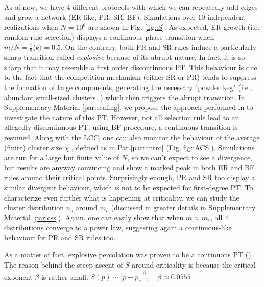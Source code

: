 As of now, we have 4 different protocols with which we can repeatedly add edges and grow a network (ER-like, PR, SR, BF). Simulations over $10$ independent realizations when $N = 10^6$ are shown in Fig. \ref{fig::S}. As expected, ER growth (i.e. random rule selection) displays a continuous phase transition when $m/N = \frac{1}{2}\langle k \rangle = 0.5$. On the contrary, both PR and SR rules induce a particularly sharp transition called \textit{explosive} because of its abrupt nature. In fact, it is so sharp that it may resemble a first order discontinuous PT. This behaviour is due to the fact that the competition mechanism (either SR or PR) tends to suppress the formation of large components, generating the necessary "powder keg" (i.e., abundant small-sized clusters, \cite{BOCCALETTI20161}) which then triggers the abrupt transition. In Supplementary Material \ref{par:scaling}, we propose the approach performed in \cite{Achlioptas} to investigate the nature of this PT. However, not all selection rule lead to an allegedly discontinuous PT: using BF procedure, a continuous transition is resumed. Along with the LCC, one can also monitor the behaviour of the average (finite) cluster size $\chi$ , defined as in Par.\ref{par::intro} (Fig.\ref{fig::ACS}). Simulations are run for a large but finite value of $N$, so we can't expect to see a divergence, but results are anyway convincing and show a marked peak in both ER and BF rules around their critical points. Surprisingly enough, PR and SR too display a similar divergent behaviour, which is not to be expected for first-degree PT. To characterize even further what is happening at criticality, we can study the cluster distribution $n_s$ around $m_c$ (discussed in greater details in Supplementary Material \ref{par:css}). Again, one can easily show that when $m \approx m_c$, all 4 distributions converge to a power law, suggesting again a continuous-like behaviour for PR and SR rules too. 

As a matter of fact, explosive percolation was proven to be a continuous PT (\cite{cont}). The reason behind the steep ascent of $S$ around criticality is because the critical exponent $\beta$ is rather small: $
S(p) \sim |p-p_c|^{\beta}, \>\>\>\>\> \beta \approx 0.0555
$

